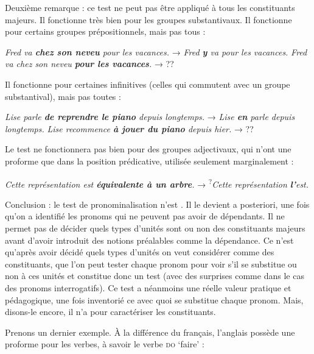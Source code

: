 {    Deuxième remarque : ce test ne peut pas être appliqué à tous les constituants majeurs. Il fonctionne très bien pour les groupes substantivaux. Il fonctionne pour certains groupes prépositionnels, mais pas tous :
    
    \ea
    \ea     \textit{{Fred va} \textbf{{chez son neveu}}  {pour les vacances.}}     \textrm{→}   \textit{{Fred} \textbf{{y}}  {va pour les vacances.}}
    \ex     \textit{{Fred va chez son neveu} \textbf{{pour les vacances}}.}     \textrm{→}  ??
    \z
    \z

    Il fonctionne pour certaines infinitives (celles qui commutent avec un groupe substantival), mais pas toutes :

    \ea
    \ea     \textit{{Lise parle} \textbf{{de reprendre le piano}}  {depuis longtemps.}}    \textrm{→}   \textit{{Lise} \textbf{{en}}  {parle depuis longtemps.}}
    \ex     \textit{{Lise recommence} \textbf{{à jouer du piano}}  {depuis hier.}}     \textrm{→}  ??
    \z
    \z

    Le test ne fonctionnera pas bien pour des groupes adjectivaux, qui n’ont une proforme que dans la position prédicative, utilisée seulement marginalement :

    \ea
    \textit{{Cette représentation est} \textbf{{équivalente à un arbre}}.}     \textrm{→}  \textsuperscript{?}\textit{{Cette représentation} \textbf{{l’}}{est.}}
    \z

    Conclusion : le test de pronominalisation n’est . Il le devient a posteriori, une fois qu’on a identifié les pronoms qui ne peuvent pas avoir de dépendants. Il ne permet pas de décider quels types d’unités sont ou non des constituants majeurs avant d’avoir introduit des notions préalables comme la dépendance. Ce n’est qu’après avoir décidé quels types d’unités on veut considérer comme des constituants, que l’on peut tester chaque pronom pour voir s’il se substitue ou non à ces unités et constitue donc un test (avec des surprises comme dans le cas des pronoms interrogatifs). Ce test a néanmoins une réelle valeur pratique et pédagogique, une fois inventorié ce avec quoi se substitue chaque pronom. Mais, disons-le encore, il n’a  pour caractériser les constituants.

    Prenons un dernier exemple. À la différence du français, l’anglais possède une proforme pour les verbes, à savoir le verbe \textsc{do} ‘faire’ :
    
}
